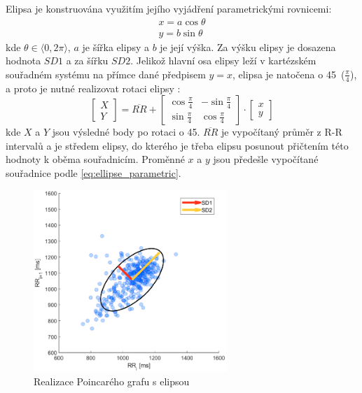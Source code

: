Elipsa je konstruována využitím jejího vyjádření parametrickými rovnicemi:
\begin{gather}
    \label{eq:ellipse_parametric}
    x = a \cos \theta \nonumber \\
    y = b \sin \theta
\end{gather}
kde $\theta \in \langle 0, 2\pi \rangle$, $a$ je šířka elipsy a $b$ je její
výška. Za výšku elipsy je dosazena hodnota $SD1$ a za šířku $SD2$. Jelikož
hlavní osa elipsy leží v kartézském souřadném systému na přímce dané předpisem
$y=x$, elipsa je natočena o 45\degree~($\frac{\pi}{4}$), a proto je nutné
realizovat rotaci elipsy \cite{Mazhar2007}:
\begin{equation}
    \begin{bmatrix}
        X \\
        Y
    \end{bmatrix}
    =
    \overline{RR} +
    \begin{bmatrix}
        \cos \frac{\pi}{4} & -\sin \frac{\pi}{4} \\
        \sin \frac{\pi}{4} & \cos \frac{\pi}{4}
    \end{bmatrix}
    \cdot
    \begin{bmatrix}
        x \\
        y
    \end{bmatrix}
\end{equation}
kde $X$ a $Y$ jsou výsledné body po rotaci o 45\degree. $\overline{RR}$ je
vypočítaný průměr z R-R intervalů a je středem elipsy, do kterého je třeba
elipsu posunout přičtením této hodnoty k oběma souřadnicím. Proměnné $x$ a $y$
jsou předešle vypočítané souřadnice podle \ref{eq:ellipse_parametric}.

\begin{figure}[h]
    \begin{center}
        \includegraphics[width=0.65\textwidth]{../assets/figures/my_poincare}
        \caption{Realizace Poincarého grafu s elipsou}
        \label{fig:my_poincare}
    \end{center}
\end{figure}

